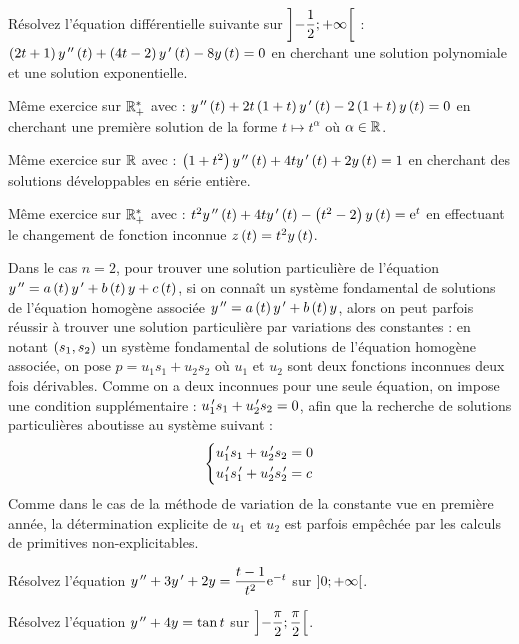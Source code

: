 \begin{exo}
Résolvez l'équation différentielle suivante sur \(\left]-\dfrac{1}{2};+\infty\right[\) : \(\left(2t+1\right)y^{\,\prime\prime}\left(t\right)+\left(4t-2\right)y^{\,\prime}\left(t\right)-8y\left(t\right)=0\) en cherchant une solution polynomiale et une solution exponentielle.
\end{exo}

\begin{exo}
Même exercice sur \(\mathbb{R}_+^*\) avec : \(y^{\,\prime\prime}\left(t\right)+2t\left(1+t\right)y^{\,\prime}\left(t\right)-2\left(1+t\right)y\left(t\right)=0\) en cherchant une première solution de la forme \(t\mapsto t^\alpha\) où \(\alpha\in\mathbb{R}\).
\end{exo}

\begin{exo}
Même exercice sur \(\mathbb{R}\) avec : \(\left(1+t^2\right)y^{\,\prime\prime}\left(t\right)+4ty^{\,\prime}\left(t\right)+2y\left(t\right)=1\) en cherchant des solutions développables en série entière.
\end{exo}

\begin{exo}
Même exercice sur \(\mathbb{R}_+^*\) avec : \(t^2y^{\,\prime\prime}\left(t\right)+4ty^{\,\prime}\left(t\right)-\left(t^2-2\right)y\left(t\right)=\mathrm{e}^{t}\) en effectuant le changement de fonction inconnue \(z\left(t\right)=t^2y\left(t\right)\).
\end{exo}

Dans le cas \(n=2\), pour trouver une solution particulière de l'équation \(y^{\,\prime\prime}=a\left(t\right)y^{\,\prime}+b\left(t\right)y+c\left(t\right)\), si on connaît un système fondamental de solutions de l'équation homogène associée \(y^{\,\prime\prime}=a\left(t\right)y^{\,\prime}+b\left(t\right)y\), alors on peut parfois réussir à trouver une solution particulière par variations des constantes : en notant \(\left(s_1,s_2\right)\) un système fondamental de solutions de l'équation homogène associée, on pose \(p=u_1s_1+u_2s_2\) où \(u_1\) et \(u_2\) sont deux fonctions inconnues deux fois dérivables. Comme on a deux inconnues pour une seule équation, on impose une condition supplémentaire : \(u_1^{\,\prime} s_1+u_2^{\,\prime} s_2=0\), afin que la recherche de solutions particulières aboutisse au système suivant : \[\begin{dcases}
u_1^{\,\prime} s_1+u_2^{\,\prime} s_2=0 \\
u_1^{\,\prime} s_1^{\,\prime}+u_2^{\,\prime} s_2^{\,\prime}=c
\end{dcases}\] Comme dans le cas de la méthode de variation de la constante vue en première année, la détermination explicite de \(u_1\) et \(u_2\) est parfois empêchée par les calculs de primitives non-explicitables.

\begin{exo}
Résolvez l'équation \(y^{\,\prime\prime}+3y^{\,\prime}+2y=\dfrac{t-1}{t^2}\mathrm{e}^{-t}\) sur \(\left]0;+\infty\right[\).
\end{exo}

\begin{exo}
Résolvez l'équation \(y^{\,\prime\prime}+4y=\tan t\) sur \(\left]-\dfrac{\pi}{2};\dfrac{\pi}{2}\right[\).
\end{exo}
